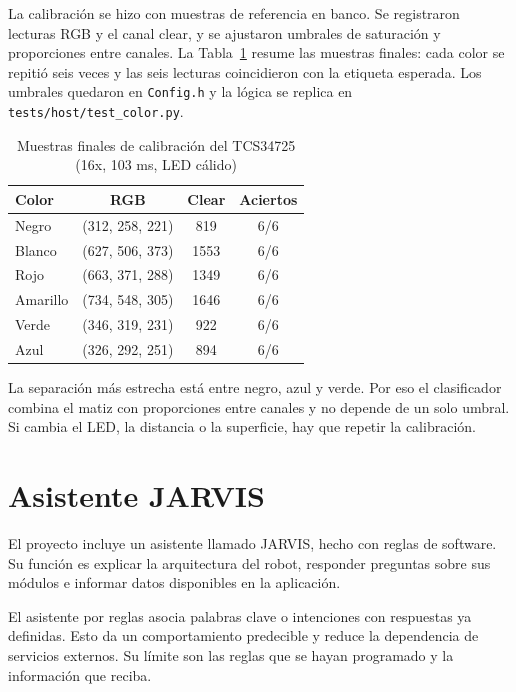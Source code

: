 \documentclass[journal]{IEEEtran}
\begin{document}
La calibración se hizo con muestras de referencia en banco. Se registraron lecturas RGB y el canal clear, y se ajustaron umbrales de saturación y proporciones entre canales. La Tabla~\ref{tab:color} resume las muestras finales: cada color se repitió seis veces y las seis lecturas coincidieron con la etiqueta esperada. Los umbrales quedaron en \texttt{Config.h} y la lógica se replica en \texttt{tests/host/test\_color.py}.

\begin{table}[t]
\centering
\caption{Muestras finales de calibración del TCS34725 (16x, 103 ms, LED cálido)}
\label{tab:color}
\scriptsize
\begin{tabular}{lccc}
\toprule
\textbf{Color} & \textbf{RGB} & \textbf{Clear} & \textbf{Aciertos} \\
\midrule
Negro    & (312, 258, 221) & 819  & 6/6 \\
Blanco   & (627, 506, 373) & 1553 & 6/6 \\
Rojo     & (663, 371, 288) & 1349 & 6/6 \\
Amarillo & (734, 548, 305) & 1646 & 6/6 \\
Verde    & (346, 319, 231) & 922  & 6/6 \\
Azul     & (326, 292, 251) & 894  & 6/6 \\
\bottomrule
\end{tabular}
\end{table}

La separación más estrecha está entre negro, azul y verde. Por eso el clasificador combina el matiz con proporciones entre canales y no depende de un solo umbral. Si cambia el LED, la distancia o la superficie, hay que repetir la calibración.


\section{Asistente JARVIS}

El proyecto incluye un asistente llamado JARVIS, hecho con reglas de software. Su función es explicar la arquitectura del robot, responder preguntas sobre sus módulos e informar datos disponibles en la aplicación.

El asistente por reglas asocia palabras clave o intenciones con respuestas ya definidas. Esto da un comportamiento predecible y reduce la dependencia de servicios externos. Su límite son las reglas que se hayan programado y la información que reciba.
\end{document}
